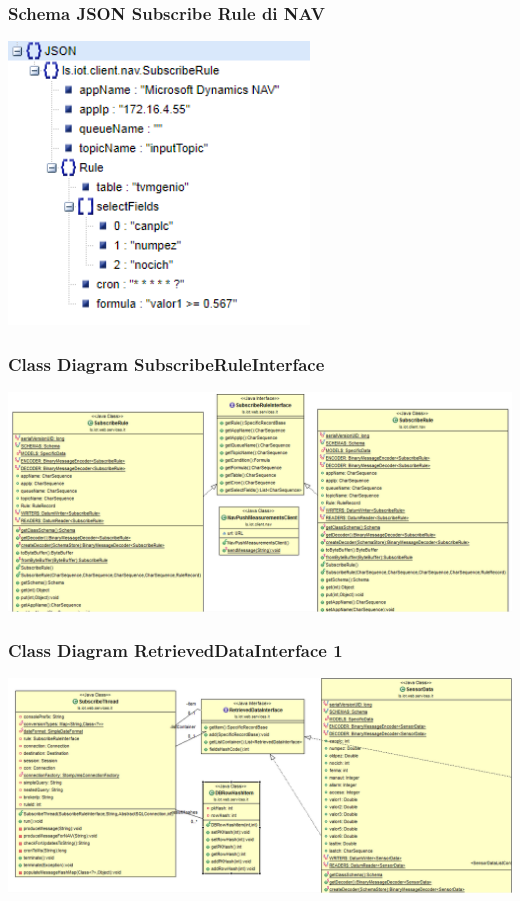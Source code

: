 \documentclass{beamer}
\begin{document}
\begin{frame}
\frametitle{Schema JSON Subscribe Rule di NAV}
\includegraphics[width=0.6\textwidth]{images/subscribe-json-2.png}
\end{frame}

\begin{frame}
\frametitle{Class Diagram SubscribeRuleInterface}
\includegraphics[width=1\textwidth]{images/ClassDiagram7.png}
\end{frame}

\begin{frame}
\frametitle{Class Diagram RetrievedDataInterface 1}
\includegraphics[width=1\textwidth]{images/ClassDiagram2.png}
\end{frame}
\end{document}
